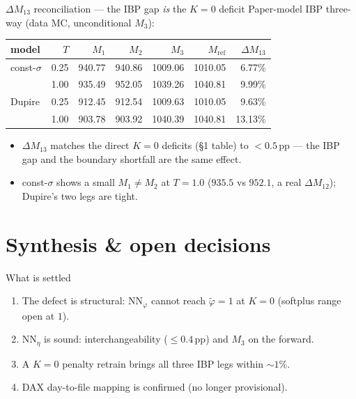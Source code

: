 \documentclass[aspectratio=169,11pt]{beamer}
\begin{document}
\begin{frame}{$\Delta M_{13}$ reconciliation --- the IBP gap \emph{is} the $K=0$ deficit}
  \footnotesize\centering
  Paper-model IBP three-way (data MC, unconditional $M_3$):\\[0.3em]
  \begin{tabular}{l r r r r r r}
    \toprule
    model & $T$ & $M_1$ & $M_2$ & $M_3$ & $M_{\mathrm{ref}}$ & $\Delta M_{13}$\\
    \midrule
    const-$\sigma$ & 0.25 & 940.77 & 940.86 & 1009.06 & 1010.05 & 6.77\%\\
                   & 1.00 & 935.49 & 952.05 & 1039.26 & 1040.81 & 9.99\%\\
    Dupire & 0.25 & 912.45 & 912.54 & 1009.63 & 1010.05 & 9.63\%\\
           & 1.00 & 903.78 & 903.92 & 1040.39 & 1040.81 & 13.13\%\\
    \bottomrule
  \end{tabular}
  \vspace{0.4em}
  \begin{itemize}\scriptsize
    \item $\Delta M_{13}$ matches the direct $K=0$ deficits (\S1 table) to $<0.5$\,pp --- the IBP gap and
          the boundary shortfall are the same effect.
    \item const-$\sigma$ shows a small $M_1\neq M_2$ at $T{=}1.0$ ($935.5$ vs $952.1$, a real $\Delta M_{12}$);
          Dupire's two legs are tight.
  \end{itemize}
\end{frame}

\section{Synthesis \& open decisions}

\begin{frame}{What is settled}
  \begin{enumerate}
    \item The defect is structural: $\mathrm{NN}_\varphi$ cannot reach $\tilde\varphi=1$ at $K=0$
          (softplus range open at $1$).
    \item $\mathrm{NN}_\eta$ is sound: interchangeability ($\le0.4$\,pp) and $M_3$ on the forward.
    \item A $K=0$ penalty retrain brings all three IBP legs within $\sim1\%$.
    \item DAX day-to-file mapping is confirmed (no longer provisional).
  \end{enumerate}
\end{frame}
\end{document}
